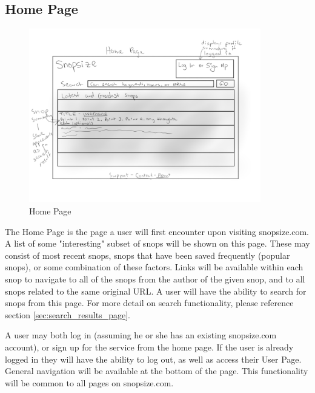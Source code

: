 \documentclass[11pt]{article}
\begin{document}
\subsection{Home Page}
\begin{figure}[htb]
\begin{center}
\includegraphics[width=0.9\textwidth]{home_page.png}
\caption{Home Page}
\label{fig:fig_home_page}
\end{center}
\end{figure}
The Home Page is the page a user will first encounter upon visiting snopsize.com. A list of some "interesting" subset of snops will be shown on this page. These may consist of most recent snops, snops that have been saved frequently (popular snops), or some combination of these factors. Links will be available within each snop to navigate to all of the snops from the author of the given snop, and to all snops related to the same original URL. A user will have the ability to search for snops from this page. For more detail on search functionality, please reference section \ref{sec:search_results_page}. 

A user may both log in (assuming he or she has an existing snopsize.com account), or sign up for the service from the home page. If the user is already logged in they will have the ability to log out, as well as access their User Page. General navigation will be available at the bottom of the page. This functionality will be common to all pages on snopsize.com.
\end{document}
